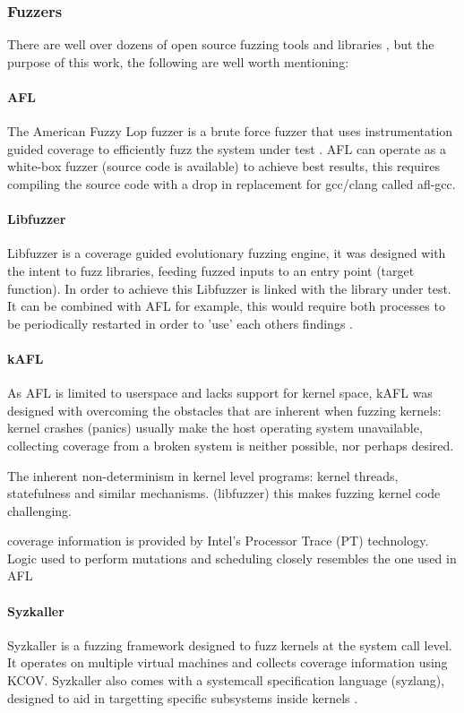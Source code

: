 \subsubsection{Fuzzers}

There are well over dozens of open source fuzzing tools and libraries \cite{awesome-fuzzing}, but the purpose of this work, the following
are well worth mentioning:


\paragraph{AFL}

The American Fuzzy Lop fuzzer is a brute force fuzzer that uses instrumentation guided coverage to 
efficiently fuzz the system under test \cite{afl}. AFL can operate as a white-box fuzzer (source code is available)
to achieve best results, this requires compiling the source code with a drop in replacement for gcc/clang
called afl-gcc. 


\paragraph{Libfuzzer}

Libfuzzer is a coverage guided evolutionary fuzzing engine, it was designed with the intent to fuzz 
libraries, feeding fuzzed inputs to an entry point (target function). In order to achieve this Libfuzzer
is linked with the library under test. It can be combined with AFL for example, this would require both processes to be 
periodically restarted in order to 'use' each others findings \cite{libfuzzer}. 


\paragraph{kAFL}


As AFL is limited to userspace and lacks support for kernel space\cite{kafl}, kAFL was designed with overcoming 
the obstacles that are inherent when fuzzing kernels: kernel crashes (panics) usually make the host operating system
unavailable, collecting coverage from a broken system is neither possible, nor perhaps desired.

The inherent non-determinism in kernel level programs: kernel threads, statefulness and similar mechanisms. (libfuzzer)
this makes fuzzing kernel code challenging.

coverage information is provided by Intel's Processor Trace (PT) technology. Logic used to perform 
mutations and scheduling closely resembles the one used in AFL\cite{kafl}

\paragraph{Syzkaller}

Syzkaller is a fuzzing framework designed to fuzz kernels at the system call level. It operates on multiple 
virtual machines and collects coverage information using KCOV. Syzkaller also comes with a systemcall specification
language (syzlang), designed to aid in targetting specific subsystems inside kernels \cite{syzkaller}.